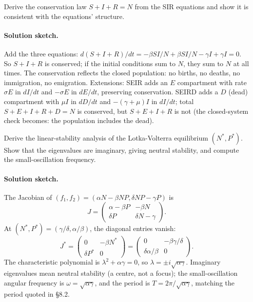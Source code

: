 \begin{exercise}
Derive the conservation law $S + I + R = N$ from the SIR equations
and show it is consistent with the equations' structure.

\paragraph{Solution sketch.} Add the three equations:
$d(S+I+R)/dt = -\beta SI/N + \beta SI/N - \gamma I + \gamma I = 0$.
So $S + I + R$ is conserved; if the initial conditions sum to $N$,
they sum to $N$ at all times. The conservation reflects the closed
population: no births, no deaths, no immigration, no emigration.
Extensions: SEIR adds an $E$ compartment with rate $\sigma E$ in
$dI/dt$ and $-\sigma E$ in $dE/dt$, preserving conservation. SEIRD
adds a $D$ (dead) compartment with $\mu I$ in $dD/dt$ and
$-(\gamma + \mu) I$ in $dI/dt$; total $S + E + I + R + D = N$ is
conserved, but $S + E + I + R$ is not (the closed-system check
becomes: the population includes the dead).
\end{exercise}

\begin{exercise}
Derive the linear-stability analysis of the Lotka-Volterra
equilibrium $(N^*, P^*)$. Show that the eigenvalues are imaginary,
giving neutral stability, and compute the small-oscillation
frequency.

\paragraph{Solution sketch.} The Jacobian of
$(f_1, f_2) = (\alpha N - \beta NP, \delta NP - \gamma P)$ is
\[
J = \begin{pmatrix} \alpha - \beta P & -\beta N \\
\delta P & \delta N - \gamma \end{pmatrix}.
\]
At $(N^*, P^*) = (\gamma/\delta, \alpha/\beta)$, the diagonal
entries vanish:
\[
J^* = \begin{pmatrix} 0 & -\beta N^* \\
\delta P^* & 0 \end{pmatrix} =
\begin{pmatrix} 0 & -\beta\gamma/\delta \\
\delta\alpha/\beta & 0 \end{pmatrix}.
\]
The characteristic polynomial is $\lambda^2 + \alpha\gamma = 0$, so
$\lambda = \pm i\sqrt{\alpha\gamma}$. Imaginary eigenvalues mean
neutral stability (a centre, not a focus); the small-oscillation
angular frequency is $\omega = \sqrt{\alpha\gamma}$, and the period
is $T = 2\pi/\sqrt{\alpha\gamma}$, matching the period quoted in
§8.2.
\end{exercise}

